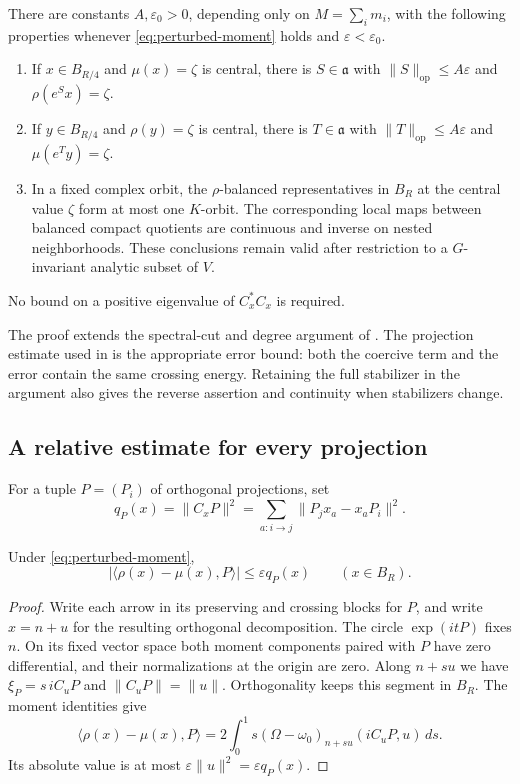 \begin{theorem}\label{thm:uniform-balancing}
There are constants $A,\varepsilon_0>0$, depending only on
$M=\sum_i m_i$, with the following properties whenever
\eqref{eq:perturbed-moment} holds and $\varepsilon<\varepsilon_0$.
\begin{enumerate}
\item If $x\in B_{R/4}$ and $\mu(x)=\zeta$ is central, there is
$S\in\mathfrak a$ with $\|S\|_{\mathrm{op}}\le A\varepsilon$ and
$\rho(e^Sx)=\zeta$.
\item If $y\in B_{R/4}$ and $\rho(y)=\zeta$ is central, there is
$T\in\mathfrak a$ with $\|T\|_{\mathrm{op}}\le A\varepsilon$ and
$\mu(e^Ty)=\zeta$.
\item In a fixed complex orbit, the $\rho$-balanced representatives in
$B_R$ at the central value $\zeta$ form at most one $K$-orbit.
The corresponding local maps between balanced compact quotients are
continuous and inverse on nested neighborhoods. These conclusions
remain valid after restriction to a $G$-invariant analytic subset of $V$.
\end{enumerate}
No bound on a positive eigenvalue of $C_x^*C_x$ is required.
\end{theorem}

The proof extends the spectral-cut and degree argument of
\cite{Wue26a,Wue26c}. The projection estimate used in
\cite{Wue26d} is the appropriate error bound: both the coercive term and
the error contain the same crossing energy. Retaining the full stabilizer
in the argument also gives the reverse assertion and continuity when
stabilizers change.

\subsection{A relative estimate for every projection}
For a tuple $P=(P_i)$ of orthogonal projections, set
\[
 q_P(x)=\|C_xP\|^2
       =\sum_{a:i\to j}\|P_jx_a-x_aP_i\|^2.
\]
\begin{lemma}\label{lem:projection-error}
Under \eqref{eq:perturbed-moment},
\[
 |\langle\rho(x)-\mu(x),P\rangle|\le\varepsilon q_P(x)
 \qquad (x\in B_R).
\]
\end{lemma}
\begin{proof}
Write each arrow in its preserving and crossing blocks for $P$, and
write $x=n+u$ for the resulting orthogonal decomposition.
The circle $\exp(itP)$ fixes $n$. On its fixed vector space both
moment components paired with $P$ have zero differential, and their
normalizations at the origin are zero. Along $n+su$ we have
$\xi_P=s\,iC_uP$ and $\|C_uP\|=\|u\|$. Orthogonality keeps this segment
in $B_R$. The moment identities give
\[
 \langle\rho(x)-\mu(x),P\rangle
 =2\int_0^1s(\Omega-\omega_0)_{n+su}(iC_uP,u)\,ds.
\]
Its absolute value is at most $\varepsilon\|u\|^2=\varepsilon q_P(x)$.
\end{proof}


